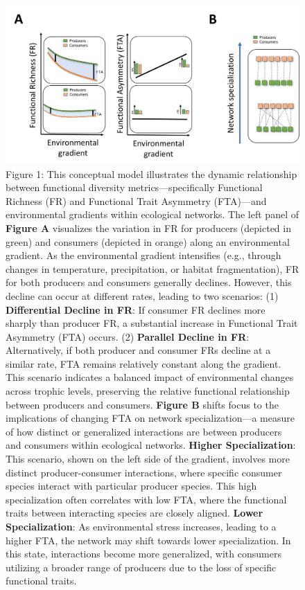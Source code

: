 \documentclass[
]{agujournal2019}
\begin{document}
\begin{figure}

{\centering \includegraphics{Main_figures/00_Figure1.png}

}

\caption{Figure 1: This conceptual model illustrates the dynamic
relationship between functional diversity metrics---specifically
Functional Richness (FR) and Functional Trait Asymmetry (FTA)---and
environmental gradients within ecological networks. The left panel of
\textbf{Figure A} visualizes the variation in FR for producers (depicted
in green) and consumers (depicted in orange) along an environmental
gradient. As the environmental gradient intensifies (e.g., through
changes in temperature, precipitation, or habitat fragmentation), FR for
both producers and consumers generally declines. However, this decline
can occur at different rates, leading to two scenarios: (1)
\textbf{Differential Decline in FR}: If consumer FR declines more
sharply than producer FR, a substantial increase in Functional Trait
Asymmetry (FTA) occurs. (2) \textbf{Parallel Decline in FR}:
Alternatively, if both producer and consumer FRs decline at a similar
rate, FTA remains relatively constant along the gradient. This scenario
indicates a balanced impact of environmental changes across trophic
levels, preserving the relative functional relationship between
producers and consumers. \textbf{Figure B} shifts focus to the
implications of changing FTA on network specialization---a measure of
how distinct or generalized interactions are between producers and
consumers within ecological networks. \textbf{Higher Specialization}:
This scenario, shown on the left side of the gradient, involves more
distinct producer-consumer interactions, where specific consumer species
interact with particular producer species. This high specialization
often correlates with low FTA, where the functional traits between
interacting species are closely aligned. \textbf{Lower Specialization}:
As environmental stress increases, leading to a higher FTA, the network
may shift towards lower specialization. In this state, interactions
become more generalized, with consumers utilizing a broader range of
producers due to the loss of specific functional traits.}

\end{figure}%
\end{document}

